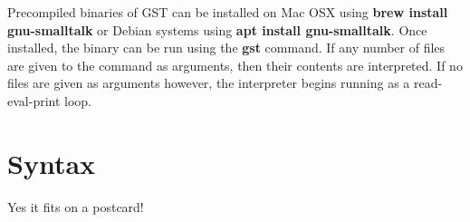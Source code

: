 Precompiled binaries of GST can be installed on Mac OSX using \textbf{brew install gnu-smalltalk} or Debian systems using \textbf{apt install gnu-smalltalk}. Once installed, the binary can be run using the \textbf{gst} command. If any number of files are given to the command as arguments, then their contents are interpreted. If no files are given as arguments however, the interpreter begins running as a read-eval-print loop.

\section{Syntax}

Yes it fits on a postcard! \cite{http://pharo.org/about}
